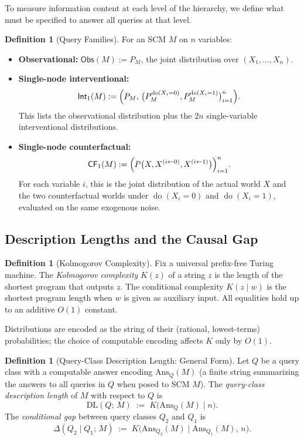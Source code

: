 \documentclass{article}
\theoremstyle{plain}
\theoremstyle{definition}
\newtheorem{definition}[theorem]{Definition}
\newcommand{\Obs}{\mathsf{Obs}}
\newcommand{\Int}{\mathsf{Int}}
\newcommand{\CF}{\mathsf{CF}}
\newcommand{\DL}{\mathrm{DL}}
\DeclareMathOperator{\doop}{do}
\newcommand{\Ans}{\mathrm{Ans}}
\begin{document}
To measure information content at each level of the hierarchy, we define what must be specified to answer all queries at that level.

\begin{definition}[Query Families]
\label{def:query-families}
For an SCM $M$ on $n$ variables:
\begin{itemize}
    \item \textbf{Observational:} $\Obs(M) := P_M$, the joint distribution over $(X_1, \ldots, X_n)$.
    
    \item \textbf{Single-node interventional:}
    \[
    \Int_1(M) := \Bigl( P_M,\, \bigl(P_M^{\doop(X_i = 0)}, P_M^{\doop(X_i = 1)}\bigr)_{i=1}^n \Bigr).
    \]
    This lists the observational distribution plus the $2n$ single-variable interventional distributions.
    
    \item \textbf{Single-node counterfactual:}
    \[
    \CF_1(M) := \Bigl( P\bigl(X, X^{(i \leftarrow 0)}, X^{(i \leftarrow 1)}\bigr) \Bigr)_{i=1}^n.
    \]
    For each variable $i$, this is the joint distribution of the actual world $X$ and the two counterfactual worlds under $\doop(X_i = 0)$ and $\doop(X_i = 1)$, evaluated on the same exogenous noise.
\end{itemize}
\end{definition}



\subsection{Description Lengths and the Causal Gap}
\label{sec:description-lengths}


\begin{definition}[Kolmogorov Complexity]
Fix a universal prefix-free Turing machine. The \emph{Kolmogorov complexity} $K(z)$ of a string $z$ is the length of the shortest program that outputs $z$. The conditional complexity $K(z \mid w)$ is the shortest program length when $w$ is given as auxiliary input. All equalities hold up to an additive $O(1)$ constant.
\end{definition}

Distributions are encoded as the string of their (rational, lowest-terms) probabilities; the choice of computable encoding affects $K$ only by $O(1)$.

\begin{definition}[Query-Class Description Length: General Form]
\label{def:qcdl-general}
Let $Q$ be a query class with a computable answer encoding $\Ans_Q(M)$ (a finite string summarizing the answers to all queries in $Q$ when posed to SCM $M$). The \emph{query-class description length} of $M$ with respect to $Q$ is
\[
\DL(Q;\, M) \;:=\; K\!\bigl(\Ans_Q(M) \mid n\bigr).
\]
The \emph{conditional gap} between query classes $Q_2$ and $Q_1$ is
\[
\Delta(Q_2 \mid Q_1;\, M) \;:=\; K\!\bigl(\Ans_{Q_2}(M) \mid \Ans_{Q_1}(M),\, n\bigr).
\]
\end{definition}
\end{document}
